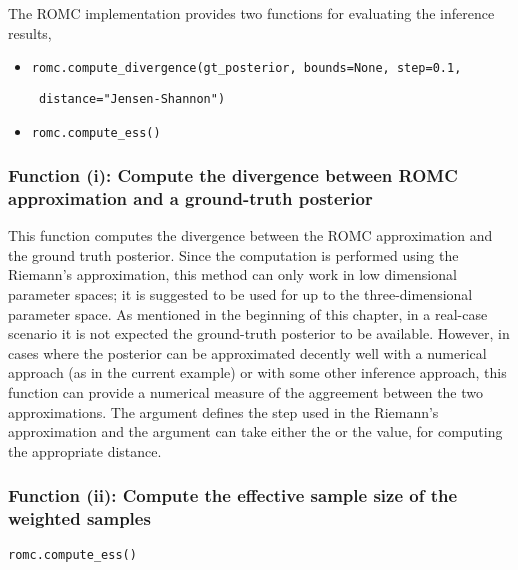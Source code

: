 The ROMC implementation provides two functions for evaluating the inference results,

\begin{itemize}[label=(\roman*)]
\item \texttt{romc.compute_divergence(gt_posterior, bounds=None, step=0.1,}

      \texttt{                        distance="Jensen-Shannon")}

\item \texttt{romc.compute_ess()}
\end{itemize}

\subsubsection*{Function (i): Compute the divergence between ROMC approximation and a ground-truth posterior}


\vspace{5mm}

\noindent
This function computes the divergence between the ROMC approximation
and the ground truth posterior. Since the computation is performed
using the Riemann's approximation, this method can only work in low
dimensional parameter spaces; it is suggested to be used for up to the
three-dimensional parameter space. As mentioned in the beginning of
this chapter, in a real-case scenario it is not expected the
ground-truth posterior to be available. However, in cases where the
posterior can be approximated decently well with a numerical approach
(as in the current example) or with some other inference approach,
this function can provide a numerical measure of the aggreement
between the two approximations. The argument  defines
the step used in the Riemann's approximation and the argument
 can take either the  or the
 value, for computing the appropriate distance.

\subsubsection*{Function (ii): Compute the effective sample size of the weighted samples}

\texttt{romc.compute_ess()}
\vspace{5mm}

